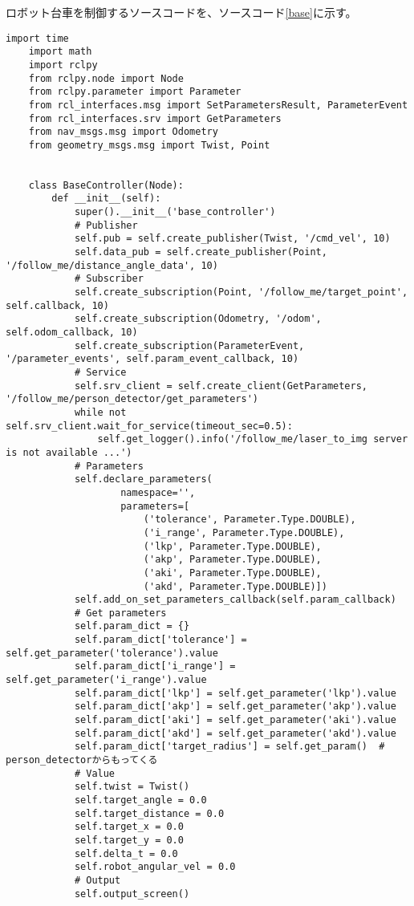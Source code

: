 ロボット台車を制御するソースコードを、ソースコード\ref{base}に示す。
\begin{lstlisting}[caption=base\_controller.py, label=base]
    import time
    import math
    import rclpy
    from rclpy.node import Node
    from rclpy.parameter import Parameter
    from rcl_interfaces.msg import SetParametersResult, ParameterEvent
    from rcl_interfaces.srv import GetParameters
    from nav_msgs.msg import Odometry
    from geometry_msgs.msg import Twist, Point
    
    
    class BaseController(Node):
        def __init__(self):
            super().__init__('base_controller')
            # Publisher
            self.pub = self.create_publisher(Twist, '/cmd_vel', 10)
            self.data_pub = self.create_publisher(Point, '/follow_me/distance_angle_data', 10)
            # Subscriber
            self.create_subscription(Point, '/follow_me/target_point', self.callback, 10)
            self.create_subscription(Odometry, '/odom', self.odom_callback, 10)
            self.create_subscription(ParameterEvent, '/parameter_events', self.param_event_callback, 10)
            # Service
            self.srv_client = self.create_client(GetParameters, '/follow_me/person_detector/get_parameters')
            while not self.srv_client.wait_for_service(timeout_sec=0.5):
                self.get_logger().info('/follow_me/laser_to_img server is not available ...')
            # Parameters
            self.declare_parameters(
                    namespace='',
                    parameters=[
                        ('tolerance', Parameter.Type.DOUBLE),
                        ('i_range', Parameter.Type.DOUBLE),
                        ('lkp', Parameter.Type.DOUBLE),
                        ('akp', Parameter.Type.DOUBLE),
                        ('aki', Parameter.Type.DOUBLE),
                        ('akd', Parameter.Type.DOUBLE)])
            self.add_on_set_parameters_callback(self.param_callback)
            # Get parameters
            self.param_dict = {}
            self.param_dict['tolerance'] = self.get_parameter('tolerance').value
            self.param_dict['i_range'] = self.get_parameter('i_range').value
            self.param_dict['lkp'] = self.get_parameter('lkp').value
            self.param_dict['akp'] = self.get_parameter('akp').value
            self.param_dict['aki'] = self.get_parameter('aki').value
            self.param_dict['akd'] = self.get_parameter('akd').value
            self.param_dict['target_radius'] = self.get_param()  # person_detectorからもってくる
            # Value
            self.twist = Twist()
            self.target_angle = 0.0
            self.target_distance = 0.0
            self.target_x = 0.0
            self.target_y = 0.0
            self.delta_t = 0.0
            self.robot_angular_vel = 0.0
            # Output
            self.output_screen()
    

\end{lstlisting}
